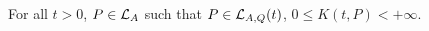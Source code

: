 \documentclass[10pt]{article}
\begin{document}
\begin{comment}
\begin{equation}
K_t=\left\lfloor \dfrac{\ln\left(\mu(Q)^2\left(t\mu(P)^{2}+\mu(P)\lambda_d(P)^{-1/2}\norm{q}_2\right)^{-1}\right)}{\ln\left(\norm{A}_P\right)}\right\rfloor+1
\end{equation}

\begin{equation}
K_t=\left\lfloor \dfrac{\ln\left(\left[L+4\norm{q}_2^2\lmin{P}^{-1}t^{-2}\mu(P)^{-1}\right]^{1/2}-
\left(2t^{-1}\mu(P)^{1/2}\lmin{P}^{-1/2}\norm{q}_2\right)\right)}{\ln\left(\norm{A}_P\right)}\right\rfloor+1
\end{equation}

Let $P\in\lyap{A}$. We define the following formula :
\begin{equation}
K_0=\left\lfloor \dfrac{\ln\left(\mu(Q)^2\left(\lmin{P}^{-1}\lmax{Q}\mu(P)^{2}+\mu(P)\lambda_d(P)^{-1/2}\norm{q}_2\right)^{-1}\right)}{\ln\left(\norm{A}_P\right)}\right\rfloor+1
\end{equation}

\begin{equation}
K_\infty=\left\lfloor \dfrac{\ln\left(\mu(Q)^2\left(\lmax{P^{-1/2} Q P^{-1/2}}\mu(P)^{2}+\mu(P)\lambda_d(P)^{-1/2}\norm{q}_2\right)^{-1}\right)}{\ln\left(\norm{A}_P\right)}\right\rfloor+1
\end{equation}

\begin{comment}
Let write hypothesis:
\begin{equation}
\label{hypo1}
P\succ 0,\ \lambda_1(Q) P- Q\succeq 0,\ P-A^\intercal P A\succ 0
\end{equation}

\begin{equation}
\kappa_1(P):=\ln\left(\alpha(Q,\xin) \alpha(P,\xin)^{-1}\lambda_1(Q)^{-1}\right) \left(\ln(\norm{A}_P^2)\right)^{-1}
\end{equation}

\begin{equation}
\label{hypo2}
P\succ 0,\ P-A^\intercal P A\succ 0
\end{equation}

\begin{equation}
\kappa_2(P):=\log\left(\alpha(Q,\xin) \alpha(P,\xin)^{-1}\lambda_{d}(P)\lambda_1(Q)^{-1}\right) \left(\log(\norm{A}_P^2)\right)^{-1}
\end{equation}
\end{comment}

\begin{prop}
For all $t>0$, $P\in \mathcal{L}_{A}$ such that $P\in \mathcal{L}_{A,Q}(t)$, $0\leq K(t,P)< +\infty$.  
\end{prop}
\end{document}
